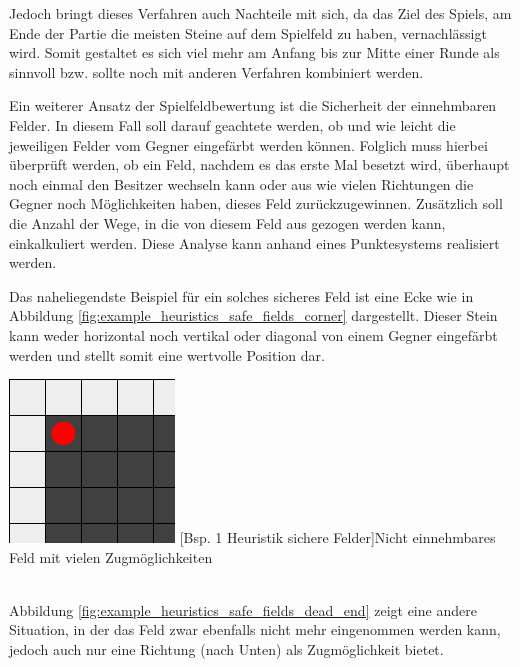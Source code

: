 \documentclass[12pt,a4paper,bibliography=totocnumbered,listof=totocnumbered]{article}
\begin{document}
Jedoch bringt dieses Verfahren auch Nachteile mit sich, da das Ziel des Spiels, am Ende der Partie die meisten Steine auf dem Spielfeld zu haben, vernachlässigt wird. Somit gestaltet es sich viel mehr am Anfang bis zur Mitte einer Runde als sinnvoll bzw. sollte noch mit anderen Verfahren kombiniert werden.


Ein weiterer Ansatz der Spielfeldbewertung ist die \glqq Sicherheit\grqq{} der einnehmbaren Felder. In diesem Fall soll darauf geachtete werden, ob und wie leicht die jeweiligen Felder vom Gegner eingefärbt werden können. Folglich muss hierbei überprüft werden, ob ein Feld, nachdem es das erste Mal besetzt wird, überhaupt noch einmal den Besitzer wechseln kann oder aus wie vielen Richtungen die Gegner noch Möglichkeiten haben, dieses Feld zurückzugewinnen. Zusätzlich soll die Anzahl der Wege, in die von diesem Feld aus gezogen werden kann, einkalkuliert werden. Diese Analyse kann anhand eines Punktesystems realisiert werden.


Das naheliegendste Beispiel für ein solches sicheres Feld ist eine Ecke wie in Abbildung \ref{fig:example_heuristics_safe_fields_corner} dargestellt. Dieser Stein kann weder horizontal noch vertikal oder diagonal von einem Gegner eingefärbt werden und stellt somit eine wertvolle Position dar. %

\vspace{1em}
\begin{minipage}{\linewidth}
	\centering
	\includegraphics[width=0.3\linewidth]{pics/heuristics_safe_fields_corner.png}
	[Bsp. 1 Heuristik sichere Felder]{Nicht einnehmbares Feld mit vielen 		Zugmöglichkeiten}
	\label{fig:example_heuristics_safe_fields_corner}
\end{minipage}
\\

Abbildung \ref{fig:example_heuristics_safe_fields_dead_end} zeigt eine andere Situation, in der das Feld zwar ebenfalls nicht mehr eingenommen werden kann, jedoch auch nur eine Richtung (nach Unten) als Zugmöglichkeit bietet.
\end{document}
